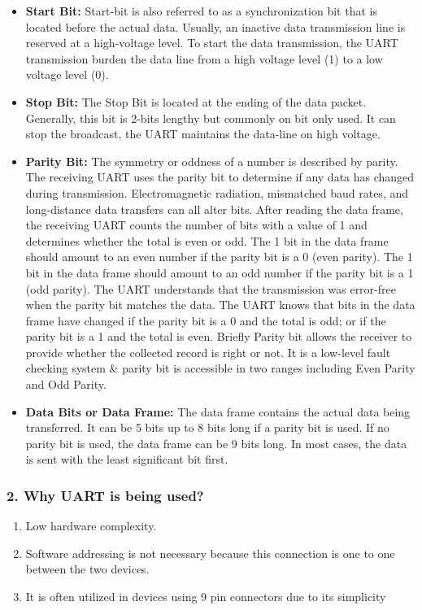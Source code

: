 \begin{itemize}
    \item \textbf{Start Bit: } Start-bit is also referred to as a synchronization bit that is located before the actual data. Usually, an inactive data transmission line is reserved at a high-voltage level. To start the data transmission, the UART transmission burden the data line from a high voltage level (1) to a low voltage level (0).
    \item \textbf{Stop Bit: } The Stop Bit is located at the ending of the data packet. Generally, this bit is 2-bits lengthy but commonly on bit only used. It can stop the broadcast, the UART maintains the data-line on high voltage.
    \item \textbf{Parity Bit: } The symmetry or oddness of a number is described by parity. The receiving UART uses the parity bit to determine if any data has changed during transmission. Electromagnetic radiation, mismatched baud rates, and long-distance data transfers can all alter bits. After reading the data frame, the receiving UART counts the number of bits with a value of 1 and determines whether the total is even or odd. The 1 bit in the data frame should amount to an even number if the parity bit is a 0 (even parity). The 1 bit in the data frame should amount to an odd number if the parity bit is a 1 (odd parity). The UART understands that the transmission was error-free when the parity bit matches the data. The UART knows that bits in the data frame have changed if the parity bit is a 0 and the total is odd; or if the parity bit is a 1 and the total is even. Briefly Parity bit allows the receiver to provide whether the collected record is right or not. It is a low-level fault checking system & parity bit is accessible in two ranges including Even Parity and Odd Parity.
    \item \textbf{Data Bits or Data Frame: } The data frame contains the actual data being transferred. It can be 5 bits up to 8 bits long if a parity bit is used. If no parity bit is used, the data frame can be 9 bits long. In most cases, the data is sent with the least significant bit first.
\end{itemize}

\subsubsection{2. Why UART is being used?}
\begin{enumerate}
    \item Low hardware complexity.
    \item Software addressing is not necessary because this connection is one to one between the two devices.
    \item It is often utilized in devices using 9 pin connectors due to its simplicity
\end{enumerate}

